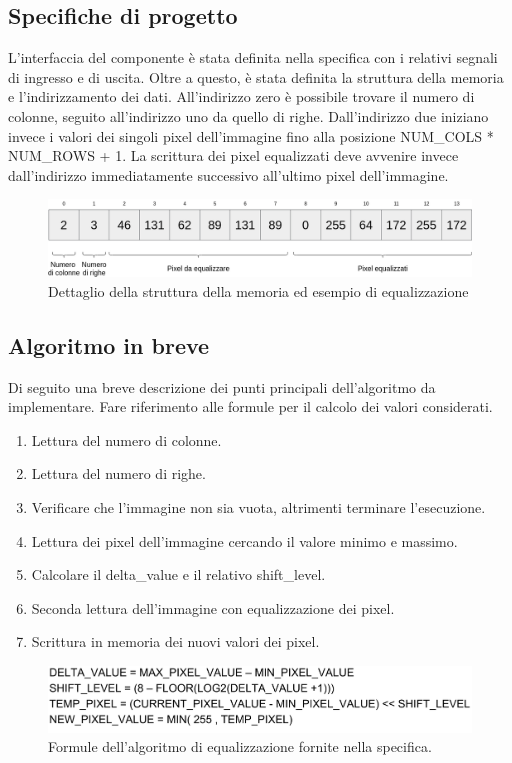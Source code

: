 \documentclass{article}
\begin{document}
\subsection{Specifiche di progetto}
L'interfaccia del componente è stata definita nella specifica con i relativi segnali di ingresso e di uscita. Oltre a questo, è stata definita la struttura della memoria e l'indirizzamento dei dati. All'indirizzo zero è possibile trovare il numero di colonne, seguito all'indirizzo uno da quello di righe. Dall'indirizzo due iniziano invece i valori dei singoli pixel dell'immagine fino alla posizione NUM\_COLS * NUM\_ROWS + 1. La scrittura dei pixel equalizzati deve avvenire invece dall'indirizzo immediatamente successivo all'ultimo pixel dell'immagine.
\begin{figure}[h]
    \includegraphics[width=\textwidth]{memory.png}
    \centering
    \caption{Dettaglio della struttura della memoria ed esempio di equalizzazione}
\end{figure}

\pagebreak

\subsection{Algoritmo in breve}
Di seguito una breve descrizione dei punti principali dell'algoritmo da implementare. Fare riferimento alle formule per il calcolo dei valori considerati.
\begin{enumerate}
    \item Lettura del numero di colonne.
    \item Lettura del numero di righe.
    \item Verificare che l'immagine non sia vuota, altrimenti terminare l'esecuzione.
    \item Lettura dei pixel dell'immagine cercando il valore minimo e massimo.
    \item Calcolare il delta\_value e il relativo shift\_level.
    \item Seconda lettura dell'immagine con equalizzazione dei pixel.
    \item Scrittura in memoria dei nuovi valori dei pixel.
\end{enumerate}
\begin{figure}[h]
    \includegraphics[width=\textwidth]{formulas.png}
    \centering
    \caption{Formule dell'algoritmo di equalizzazione fornite nella specifica.}
\end{figure}
\end{document}

